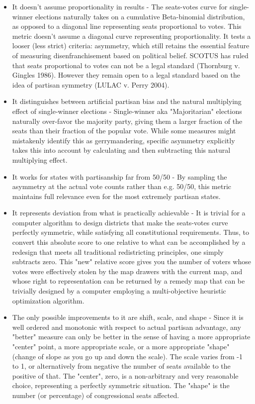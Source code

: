 \documentclass[preprint,12pt]{article}
\begin{document}
\begin{itemize}

\item It doesn't assume proportionality in results - The seats-votes curve for single-winner elections naturally takes on a cumulative Beta-binomial distribution, as opposed to a diagonal line representing seats proportional to votes.  This metric doesn't assume a diagonal curve representing proportionality.  It tests a looser (less strict) criteria: asymmetry, which still retains the essential feature of measuring disenfranchisement based on political belief.  SCOTUS has ruled that seats proportional to votes can not be a legal standard (Thornburg v. Gingles 1986).   However they remain open to a legal standard based on the idea of partisan symmetry (LULAC v. Perry 2004).
 
\item It distinguishes between artificial partisan bias and the natural multiplying effect of single-winner elections -  Single-winner aka "Majoritarian" elections naturally over-favor the majority party, giving them a larger fraction of the seats than their fraction of the popular vote.  
While some measures might mistakenly identify this as gerrymandering, specific asymmetry explicitly takes this into account by calculating and then subtracting this natural multiplying effect.

\item It works for states with partisanship far from 50/50 - By sampling the asymmetry at the actual vote counts rather than e.g. 50/50, this metric maintains full relevance even for the most extremely partisan states.

\item It represents deviation from what is practically achievable - It is trivial for a computer algorithm to design districts that make the seats-votes curve perfectly symmetric, while satisfying all constitutional requirements.  
Thus, to convert this absolute score to one relative to what can be accomplished by a redesign that meets all traditional redistricting principles, one simply subtracts zero.  
This "new" relative score gives you the number of voters whose votes were effectively stolen by the map drawers with the current map, and whose right to representation can be returned by a remedy map that can be trivially designed by a computer employing a multi-objective heuristic optimization algorithm.

\item The only possible improvements to it are shift, scale, and shape - Since it is well ordered and monotonic with respect to actual partisan advantage, any "better" measure can only be better in the sense of having a more appropriate "center" point, a more appropriate scale, or a more appropriate "shape" (change of slope as you go up and down the scale).  The scale varies from -1 to 1, or alternatively from negative the number of seats available to the positive of that.  The "center",  zero, is a non-arbitrary and very reasonable choice, representing a perfectly symmetric situation.   The "shape" is the number (or percentage) of congressional seats affected.


\end{itemize}
\end{document}
